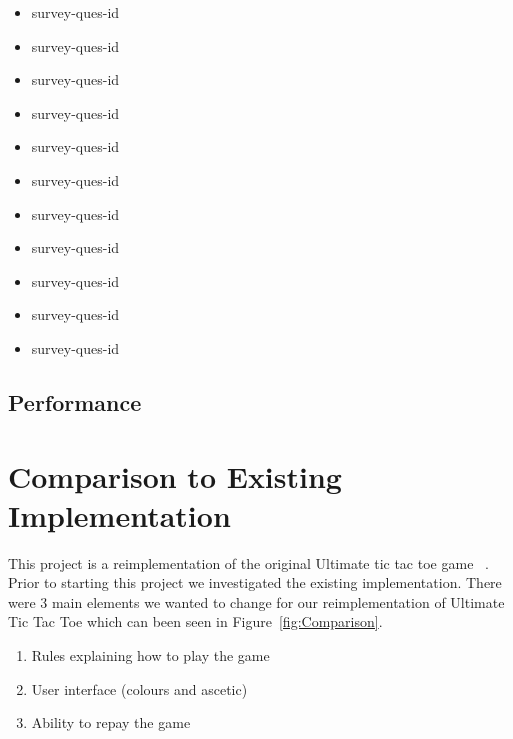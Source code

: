 \documentclass[12pt, titlepage]{article}
\newcounter{USnum}
\newcommand{\ttheUSnum}{survey-ques-id \theUSnum}
\begin{document}
\begin{itemize}

\item {\ttheUSnum \label{USq1}\\}
\item {\ttheUSnum \label{USq2}\\}
\item {\ttheUSnum \label{USq3}\\}
\item {\ttheUSnum \label{USq4}\\}
\item {\ttheUSnum \label{USq5}\\}
\item {\ttheUSnum \label{USq6}\\}
\item {\ttheUSnum \label{USq7}\\}
\item {\ttheUSnum \label{USq8}\\}
\item {\ttheUSnum \label{USq9}\\}
\item {\ttheUSnum \label{USq10}\\}
\item {\ttheUSnum \label{USq11}\\}

\end{itemize}
		
\subsection{Performance}

	
\section{Comparison to Existing Implementation}
This project is a reimplementation of the original Ultimate tic tac toe game ~\citep{githubREF}. Prior to starting this project we investigated the existing implementation. There were 3 main elements we wanted to change for our reimplementation of Ultimate Tic Tac Toe which can been seen in Figure~\ref{fig:Comparison}.
\begin{enumerate}
\item Rules explaining how to play the game
\item User interface (colours and ascetic)
\item Ability to repay the game
\end{enumerate}
\end{document}

